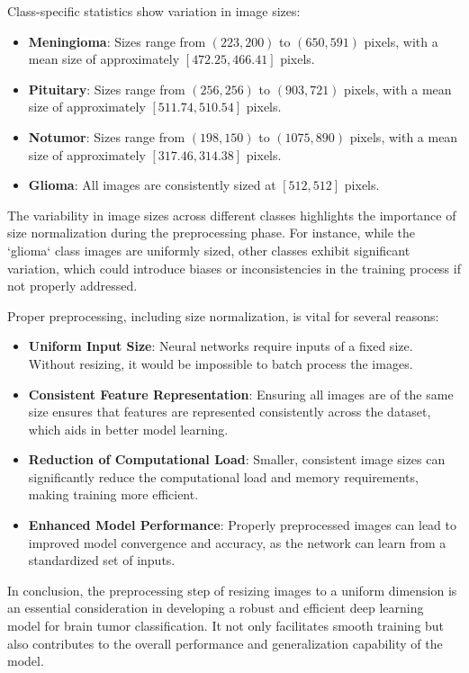 Class-specific statistics show variation in image sizes:
\begin{itemize}
    \item \textbf{Meningioma}: Sizes range from $(223, 200)$ to $(650, 591)$ pixels, with a mean size of approximately $[472.25, 466.41]$ pixels.
    \item \textbf{Pituitary}: Sizes range from $(256, 256)$ to $(903, 721)$ pixels, with a mean size of approximately $[511.74, 510.54]$ pixels.
    \item \textbf{Notumor}: Sizes range from $(198, 150)$ to $(1075, 890)$ pixels, with a mean size of approximately $[317.46, 314.38]$ pixels.
    \item \textbf{Glioma}: All images are consistently sized at $[512, 512]$ pixels.
\end{itemize}

The variability in image sizes across different classes highlights the importance of size normalization during the preprocessing phase. For instance, while the `glioma` class images are uniformly sized, other classes exhibit significant variation, which could introduce biases or inconsistencies in the training process if not properly addressed.

Proper preprocessing, including size normalization, is vital for several reasons:
\begin{itemize}
    \item \textbf{Uniform Input Size}: Neural networks require inputs of a fixed size. Without resizing, it would be impossible to batch process the images.
    \item \textbf{Consistent Feature Representation}: Ensuring all images are of the same size ensures that features are represented consistently across the dataset, which aids in better model learning.
    \item \textbf{Reduction of Computational Load}: Smaller, consistent image sizes can significantly reduce the computational load and memory requirements, making training more efficient.
    \item \textbf{Enhanced Model Performance}: Properly preprocessed images can lead to improved model convergence and accuracy, as the network can learn from a standardized set of inputs.
\end{itemize}

In conclusion, the preprocessing step of resizing images to a uniform dimension is an essential consideration in developing a robust and efficient deep learning model for brain tumor classification. It not only facilitates smooth training but also contributes to the overall performance and generalization capability of the model.

